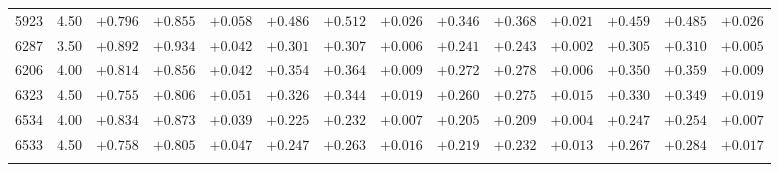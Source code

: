 \documentclass[]{aa}
\begin{document}
\begin{appendix}
\begin{table*}
\begin{center}
\begin{tabular}{llllllllllllll}
5923  &4.50 & $+0.796$ & $+0.855$ & $+0.058$ & $+0.486$ & $+0.512$ & $+0.026$ & $+0.346$ & $+0.368$ & $+0.021$ & $+0.459 $& $+0.485$ & $+0.026$ \\
6287  &3.50 & $+0.892$ & $+0.934$ & $+0.042$ & $+0.301$ & $+0.307$ & $+0.006$ & $+0.241$ & $+0.243$ & $+0.002$ & $+0.305 $& $+0.310$ & $+0.005$ \\
6206  &4.00 & $+0.814$ & $+0.856$ & $+0.042$ & $+0.354$ & $+0.364$ & $+0.009$ & $+0.272$ & $+0.278$ & $+0.006$ & $+0.350 $& $+0.359$ & $+0.009$ \\
6323  &4.50 & $+0.755$ & $+0.806$ & $+0.051$ & $+0.326$ & $+0.344$ & $+0.019$ & $+0.260$ & $+0.275$ & $+0.015$ & $+0.330 $& $+0.349$ & $+0.019$ \\
6534  &4.00 & $+0.834$ & $+0.873$ & $+0.039$ & $+0.225$ & $+0.232$ & $+0.007$ & $+0.205$ & $+0.209$ & $+0.004$ & $+0.247 $& $+0.254$ & $+0.007$ \\
6533  &4.50 & $+0.758$ & $+0.805$ & $+0.047$ & $+0.247$ & $+0.263$ & $+0.016$ & $+0.219$ & $+0.232$ & $+0.013$ & $+0.267 $& $+0.284$ & $+0.017$ \\
\hline\noalign{\smallskip}
\hline\noalign{\smallskip}
\end{tabular}
\end{center}
\end{table*}


\end{appendix}
\end{document}
